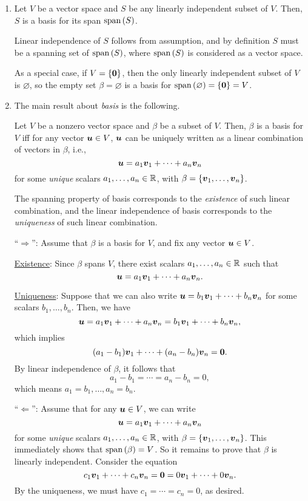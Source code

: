 \begin{enumerate}
\item Let \(V\) be a vector space and \(S\) be any linearly independent subset
of \(V\). Then, \(S\) is a basis for its span \(\operatorname{span}\qty(S)\).

\begin{pf}
Linear independence of \(S\) follows from assumption, and by definition \(S\)
must be a spanning set of \(\operatorname{span}\qty(S)\), where \(\operatorname{span}\qty(S)\) is considered as a
vector space.
\end{pf}

As a special case, if \(V=\{\vb*{0}\}\), then the only linearly
independent subset of \(V\) is \(\varnothing\), so the empty set
\(\beta=\varnothing\) is a basis for \(\operatorname{span}\qty(\varnothing)=\{\vb*{0}\}=V\).

\item The main result about \emph{basis} is the following.
\begin{theorem}
\label{thm:basis-unique-lin-comb}
Let \(V\) be a nonzero vector space and \(\beta\) be a subset of \(V\). Then,
\(\beta\) is a basis for \(V\) iff for any vector \(\vb*{u}\in V\),
\(\vb*{u}\) can be uniquely written as a linear combination of vectors in
\(\beta\), i.e.,
\[
\vb*{u}=a_1\vb*{v}_1+\dotsb+a_n\vb*{v}_n
\]
for some \emph{unique} scalars \(a_1,\dotsc,a_n\in\mathbb{R}\), with
\(\beta=\{\vb*{v}_1,\dotsc,\vb*{v}_n\}\).
\end{theorem}
\begin{intuition}
The spanning property of basis corresponds to the \emph{existence} of such
linear combination, and the linear independence of basis corresponds to the
\emph{uniqueness} of such linear combination.
\end{intuition}

\begin{pf}
``\(\Rightarrow\)'': Assume that \(\beta\) is a basis for \(V\), and fix any
vector \(\vb*{u}\in V\).

\underline{Existence}: Since \(\beta\) spans \(V\), there exist scalars
\(a_1,\dotsc,a_n\in\mathbb{R}\) such that
\[
\vb*{u}=a_1\vb*{v}_1+\dotsb+a_n\vb*{v}_n.
\]

\underline{Uniqueness}: Suppose that we can also write
\(\vb*{u}=b_1\vb*{v}_1+\dotsb+b_n\vb*{v}_n\) for some scalars
\(b_1,\dotsc,b_n\). Then, we have
\[
\vb*{u}=a_1\vb*{v}_1+\dotsb+a_n\vb*{v}_n=b_1\vb*{v}_1+\dotsb+b_n\vb*{v}_n,
\]
which implies
\[
(a_1-b_1)\vb*{v}_1+\dotsb+(a_n-b_n)\vb*{v}_n=\vb*{0}.
\]
By linear independence of \(\beta\), it follows that
\[
a_1-b_1=\dotsb=a_n-b_n=0,
\]
which means \(a_1=b_1,\dotsc,a_n=b_n\).

``\(\Leftarrow\)'': Assume that for any \(\vb*{u}\in V\), we can write
\[
\vb*{u}=a_1\vb*{v}_1+\dotsb+a_n\vb*{v}_n
\]
for some \emph{unique} scalars \(a_1,\dotsc,a_n\in\mathbb{R}\), with
\(\beta=\{\vb*{v}_1,\dotsc,\vb*{v}_n\}\). This immediately shows that
\(\operatorname{span}\qty(\beta)=V\). So it remains to prove that \(\beta\) is linearly
independent. Consider the equation
\[
c_1\vb*{v}_1+\dotsb+c_n\vb*{v}_n=\vb*{0}=0\vb*{v}_1+\dotsb+0\vb*{v}_n.
\]
By the uniqueness, we must have \(c_1=\dotsb=c_n=0\), as desired.
\end{pf}
\end{enumerate}
